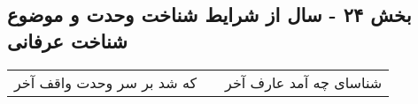 \begin{center}
\section*{بخش ۲۴ - سال از شرایط شناخت وحدت و موضوع شناخت عرفانی}
\label{sec:sh024}
\begin{longtable}{l p{0.5cm} r}
که شد بر سر وحدت واقف آخر
&&
شناسای چه آمد عارف آخر
\\
\end{longtable}
\end{center}
